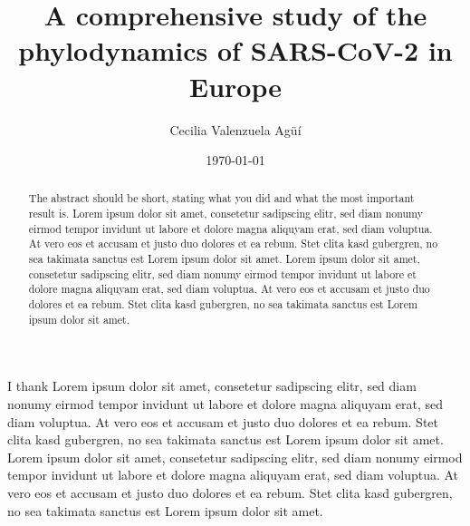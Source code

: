\documentclass[a4paper, oneside]{discothesis}
\title{\fontsize{18}{22}\selectfont A comprehensive study of the phylodynamics of SARS-CoV-2 in Europe}
\author{Cecilia Valenzuela Agüí}
\institute{Department of Biosystems Science and Engineering \\[2pt]
Computational Evolution \\[2pt]
ETH Zürich}
\date{\today}
\begin{document}
\frontmatter %
\maketitle

\cleardoublepage

\begin{acknowledgements}
	I thank Lorem ipsum dolor sit amet, consetetur sadipscing elitr, sed diam nonumy eirmod tempor invidunt ut labore et dolore magna aliquyam erat, sed diam voluptua. At vero eos et accusam et justo duo dolores et ea rebum. Stet clita kasd gubergren, no sea takimata sanctus est Lorem ipsum dolor sit amet. Lorem ipsum dolor sit amet, consetetur sadipscing elitr, sed diam nonumy eirmod tempor invidunt ut labore et dolore magna aliquyam erat, sed diam voluptua. At vero eos et accusam et justo duo dolores et ea rebum. Stet clita kasd gubergren, no sea takimata sanctus est Lorem ipsum dolor sit amet.
\end{acknowledgements}


\begin{abstract}
    The abstract should be short, stating what you did and what the most important result is.
	Lorem ipsum dolor sit amet, consetetur sadipscing elitr, sed diam nonumy eirmod tempor invidunt ut labore et dolore magna aliquyam erat, sed diam voluptua. At vero eos et accusam et justo duo dolores et ea rebum. Stet clita kasd gubergren, no sea takimata sanctus est Lorem ipsum dolor sit amet. Lorem ipsum dolor sit amet, consetetur sadipscing elitr, sed diam nonumy eirmod tempor invidunt ut labore et dolore magna aliquyam erat, sed diam voluptua. At vero eos et accusam et justo duo dolores et ea rebum. Stet clita kasd gubergren, no sea takimata sanctus est Lorem ipsum dolor sit amet.
\end{abstract}

\tableofcontents

\mainmatter %







\end{document}
